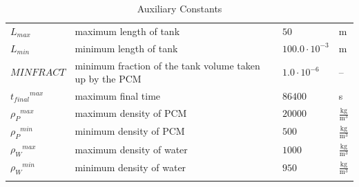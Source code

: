 \documentclass[12pt]{article}
\begin{document}
\begin{longtabu}{l X[l] l l}
\\
${L_{max}}$ & maximum length of tank & $50$ & m
\\
${L_{min}}$ & minimum length of tank & $100.0\cdot{}10^{-3}$ & m
\\
$MINFRACT$ & minimum fraction of the tank volume taken up by the PCM & $1.0\cdot{}10^{-6}$ & --
\\
${{t_{final}}^{max}}$ & maximum final time & $86400$ & s
\\
${{ρ_{P}}^{max}}$ & maximum density of PCM & $20000$ & $\frac{\text{kg}}{\text{m}^{3}}$
\\
${{ρ_{P}}^{min}}$ & minimum density of PCM & $500$ & $\frac{\text{kg}}{\text{m}^{3}}$
\\
${{ρ_{W}}^{max}}$ & maximum density of water & $1000$ & $\frac{\text{kg}}{\text{m}^{3}}$
\\
${{ρ_{W}}^{min}}$ & minimum density of water & $950$ & $\frac{\text{kg}}{\text{m}^{3}}$
\\
\bottomrule
\caption{Auxiliary Constants}
\label{Table:TAuxConsts}
\end{longtabu}
\end{document}
